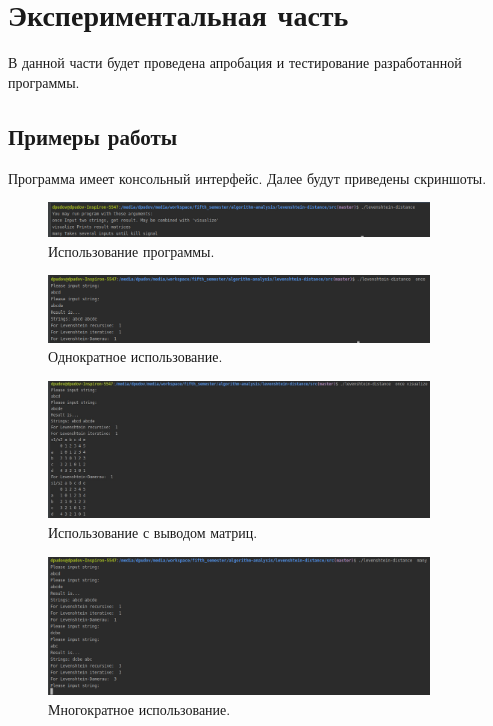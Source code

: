 \chapter{Экспериментальная часть}
\label{cha:research}

В данной части будет проведена апробация и тестирование разработанной программы.

\section{Примеры работы}

Программа имеет консольный интерфейс. Далее будут приведены скриншоты.

\begin{figure}
    \includegraphics[width=0.9\textwidth]{screenshots/screenshot-usage}
    \caption{Использование программы.}
    \label{screenshot-usage}
\end{figure}

\begin{figure}
    \includegraphics[width=0.9\textwidth]{screenshots/screenshot-once}
    \caption{Однократное использование.}
    \label{screenshot-once}
\end{figure}

\begin{figure}
    \includegraphics[width=0.9\textwidth]{screenshots/screenshot-visualize}
    \caption{Использование с выводом матриц.}
    \label{screenshot-visualize}
\end{figure}

\begin{figure}
    \includegraphics[width=0.9\textwidth]{screenshots/screenshot-many}
    \caption{Многократное использование.}
    \label{screenshot-many}
\end{figure}

